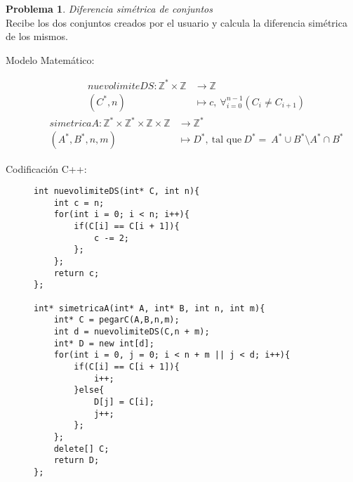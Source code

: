 \documentclass{article}
\theoremstyle{plain}
\theoremstyle{definition}
\newtheorem{problem}{Problema}
\begin{document}
\begin{problem}\emph{Diferencia simétrica de conjuntos}\\
Recibe los dos conjuntos creados por el usuario y calcula la diferencia simétrica de los mismos.
%
\begin{description}
\item[Modelo Matemático:]
%
\begin{align*}
nuevolimiteDS: \mathbb{Z}^*\times\mathbb{Z}&\to \mathbb{Z}\\
(C^*,n) &\mapsto c,\ \forall_{i=0}^{n-1}(C_i \neq C_{i+1})
\end{align*}
%
\begin{align*}
simetricaA: \mathbb{Z}^*\times\mathbb{Z}^*\times\mathbb{Z}\times\mathbb{Z}&\to \mathbb{Z}^*\\
(A^*,B^*,n,m) &\mapsto D^*,\ \text{tal que}\ D^* = \ A^* \cup B^* \setminus A^* \cap B^*
\end{align*}
%
\item[Codificación \textsf{C++}:]\hfill
%
\begin{verbatim}
int nuevolimiteDS(int* C, int n){
    int c = n;
    for(int i = 0; i < n; i++){
        if(C[i] == C[i + 1]){
            c -= 2;
        };
    };
    return c;
};

int* simetricaA(int* A, int* B, int n, int m){
    int* C = pegarC(A,B,n,m);
    int d = nuevolimiteDS(C,n + m);
    int* D = new int[d];
    for(int i = 0, j = 0; i < n + m || j < d; i++){
        if(C[i] == C[i + 1]){
            i++;
        }else{
            D[j] = C[i];
            j++;
        };
    };
    delete[] C;
    return D;
};
\end{verbatim}
\end{description}
\end{problem}
\end{document}
